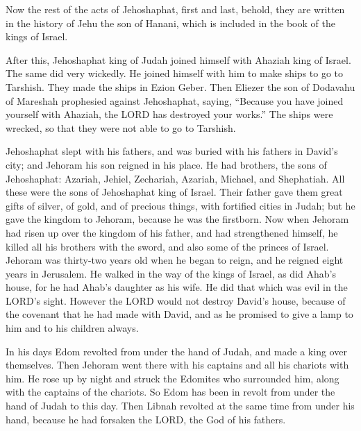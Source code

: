 \myverse{}Now the rest of the acts of Jehoshaphat, first and last, behold,
they are written in the history of Jehu the son of Hanani, which is included in the book of the kings
of Israel.

\myverse{}After this, Jehoshaphat king of Judah joined himself with Ahaziah
king of Israel. The same did very wickedly.
\myverse{}He joined himself with him to make ships to go to Tarshish. They made the
ships in Ezion Geber.
\myverse{}Then Eliezer the son of Dodavahu of Mareshah prophesied against Jehoshaphat,
saying, “Because you have joined yourself with Ahaziah, the LORD has destroyed your works.” The ships
were wrecked, so that they were not able to go to Tarshish.


\mychapter{} \myverse*{}Jehoshaphat slept with his fathers, and was buried with his fathers
in David’s city; and Jehoram his son reigned in his place.
\myverse{}He had brothers, the sons of Jehoshaphat: Azariah, Jehiel, Zechariah, Azariah,
Michael, and Shephatiah. All these were the sons of Jehoshaphat king of Israel.
\myverse{}Their father gave them great gifts of silver, of gold, and of precious things,
with fortified cities in Judah; but he gave the kingdom to Jehoram, because he was the firstborn.
\myverse{}Now when Jehoram had risen up over the kingdom of his father, and had strengthened
himself, he killed all his brothers with the sword, and also some of the princes of Israel.
\myverse{}Jehoram was thirty-two years old when he began to reign, and he reigned eight
years in Jerusalem.
\myverse{}He walked in the way of the kings of Israel, as did Ahab’s house, for he had
Ahab’s daughter as his wife. He did that which was evil in the LORD’s sight.
\myverse{}However the LORD would not destroy David’s house, because of the covenant that
he had made with David, and as he promised to give a lamp to him and to his children always.

\myverse{}In his days Edom revolted from under the hand of Judah, and made
a king over themselves.
\myverse{}Then Jehoram went there with his captains and all his chariots with him. He
rose up by night and struck the Edomites who surrounded him, along with the captains of the chariots.
\myverse{}So Edom has been in revolt from under the hand of Judah to this day. Then
Libnah revolted at the same time from under his hand, because he had forsaken the LORD, the God of his
fathers.

